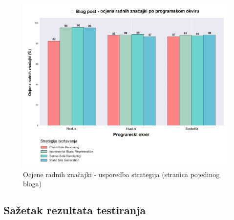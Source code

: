 \begin{figure}[H]
    \centering
    \includegraphics[width=\textwidth]{slike/rezultati/blog-post/blogPost_strategy_comparison.png}
    \caption{Ocjene radnih značajki - usporedba strategija (stranica pojedinog bloga) }
    \label{fig:testiranje-blog-post-usporedba-strategija}
\end{figure}

\newpage

\subsection{Sažetak rezultata testiranja}

